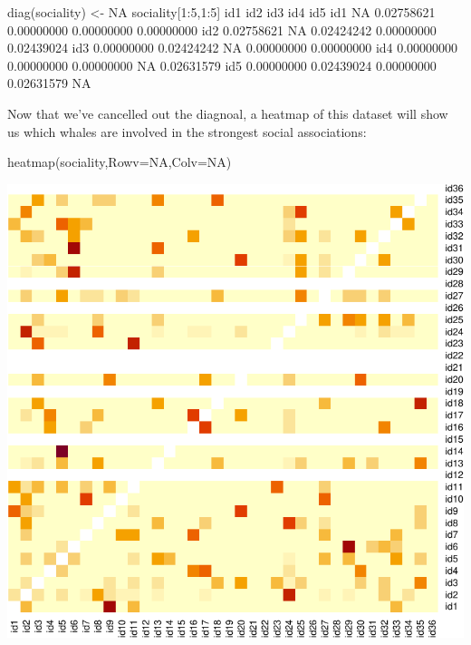 \documentclass[
]{book}
\newenvironment{Shaded}{\begin{snugshade}}{\end{snugshade}}
\newcommand{\AttributeTok}[1]{\textcolor[rgb]{0.77,0.63,0.00}{#1}}
\newcommand{\ConstantTok}[1]{\textcolor[rgb]{0.00,0.00,0.00}{#1}}
\newcommand{\DecValTok}[1]{\textcolor[rgb]{0.00,0.00,0.81}{#1}}
\newcommand{\FloatTok}[1]{\textcolor[rgb]{0.00,0.00,0.81}{#1}}
\newcommand{\FunctionTok}[1]{\textcolor[rgb]{0.00,0.00,0.00}{#1}}
\newcommand{\NormalTok}[1]{#1}
\newcommand{\OtherTok}[1]{\textcolor[rgb]{0.56,0.35,0.01}{#1}}
\newcommand{\SpecialCharTok}[1]{\textcolor[rgb]{0.00,0.00,0.00}{#1}}
\begin{document}
\begin{Shaded}
\begin{Highlighting}[]
\FunctionTok{diag}\NormalTok{(sociality) }\OtherTok{\textless{}{-}} \ConstantTok{NA}
\NormalTok{sociality[}\DecValTok{1}\SpecialCharTok{:}\DecValTok{5}\NormalTok{,}\DecValTok{1}\SpecialCharTok{:}\DecValTok{5}\NormalTok{]}
\NormalTok{           id1        id2        id3        id4        id5}
\NormalTok{id1         }\ConstantTok{NA} \FloatTok{0.02758621} \FloatTok{0.00000000} \FloatTok{0.00000000} \FloatTok{0.00000000}
\NormalTok{id2 }\FloatTok{0.02758621}         \ConstantTok{NA} \FloatTok{0.02424242} \FloatTok{0.00000000} \FloatTok{0.02439024}
\NormalTok{id3 }\FloatTok{0.00000000} \FloatTok{0.02424242}         \ConstantTok{NA} \FloatTok{0.00000000} \FloatTok{0.00000000}
\NormalTok{id4 }\FloatTok{0.00000000} \FloatTok{0.00000000} \FloatTok{0.00000000}         \ConstantTok{NA} \FloatTok{0.02631579}
\NormalTok{id5 }\FloatTok{0.00000000} \FloatTok{0.02439024} \FloatTok{0.00000000} \FloatTok{0.02631579}         \ConstantTok{NA}
\end{Highlighting}
\end{Shaded}

Now that we've cancelled out the diagnoal, a heatmap of this dataset will show us which whales are involved in the strongest social associations:

\begin{Shaded}
\begin{Highlighting}[]
\FunctionTok{heatmap}\NormalTok{(sociality,}\AttributeTok{Rowv=}\ConstantTok{NA}\NormalTok{,}\AttributeTok{Colv=}\ConstantTok{NA}\NormalTok{)}
\end{Highlighting}
\end{Shaded}

\includegraphics{figures/unnamed-chunk-393-1.pdf}
\end{document}
